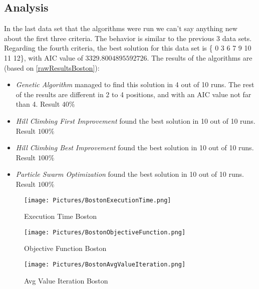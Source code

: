 \subsection{Analysis}
In the last data set that the algorithms were run we can't say anything new about the first three criteria. The behavior is similar to the previous 3 data sets. Regarding the fourth criteria, the best solution for this data set is \{ 0 3 6 7 9 10 11 12\}, with AIC value of $3329.8004895592726$. The results of the algorithms are (based on \ref{rawResultsBoston}):
\begin{itemize}
	\item \textit{Genetic Algorithm} managed to find this solution in 4 out of 10 runs. The rest of the results are different in 2 to 4 positions, and with an AIC value not far than 4. Result $40 \%$
	\item \textit{Hill Climbing First Improvement} found the best solution in 10 out of 10 runs. Result $100 \%$
	\item \textit{Hill Climbing Best Improvement} found the best solution in 10 out of 10 runs. Result $100 \%$
	\item \textit{Particle Swarm Optimization} found the best solution in 10 out of 10 runs. Result $100 \%$
\end{itemize}

\begin{figure}[ht]
	\texttt{[image: Pictures/BostonExecutionTime.png]}
	\caption{ Execution Time Boston}
	\label{Execution Time Boston}
\end{figure}

\begin{figure}[ht]
	\texttt{[image: Pictures/BostonObjectiveFunction.png]}
	\caption{ Objective Function Boston }
	\label{Objective Function Boston}
\end{figure}

\begin{figure}[ht]
	\texttt{[image: Pictures/BostonAvgValueIteration.png]}
	\caption{ Avg Value Iteration Boston }
	\label{Avg Value Iteration Boston}
\end{figure}

